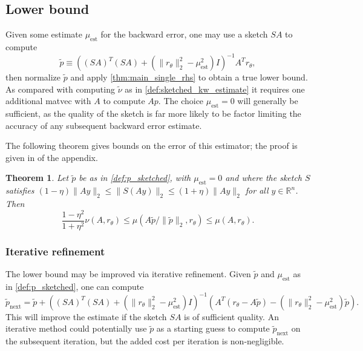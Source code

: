 \documentclass{article}
\newtheorem{theorem}{Theorem}
\newcommand{\ts}{^T}
\DeclareMathOperator{\est}{est}
\begin{document}
\subsection{Lower bound} \label{sec:lower_bound}

Given some estimate $\mu_{\text{est}}$ for the backward error, one may use a sketch $SA$ to compute
\begin{equation}\label{def:p_sketched}
    \widetilde{p} \equiv \left((SA)\ts (SA) + (\|r_\theta\|_2^2 - \mu_{\text{est}}^2)I\right)^{-1}A\ts r_\theta,
\end{equation}
then normalize $\widetilde{p}$ and apply \cref{thm:main_single_rhs} to obtain a true lower bound. As compared with computing $\widetilde{\nu}$ as in \cref{def:sketched_kw_estimate} it requires one additional matvec with $A$ to compute $Ap$. The choice $\mu_{\est}=0$ will generally be sufficient, as the quality of the sketch is far more likely to be factor limiting the accuracy of any subsequent backward error estimate.

The following theorem gives bounds on the error of this estimator; the proof is given in  of the appendix.
\begin{theorem}\label{thm:lower_bound_accuracy}
    Let $\widetilde{p}$ be as in \cref{def:p_sketched}, with $\mu_{\text{est}} =0$ and where the sketch $S$ satisfies $(1-\eta)\|Ay\|_2\leq \|S(Ay)\|_2\leq (1+\eta)\|Ay\|_2$ for all $y\in \mathbb{R}^n$. Then
    \begin{equation*}
        \frac{1-\eta^2}{1+\eta^2}\nu(A,r_\theta) \leq \mu(A\widetilde{p}/\|\widetilde{p}\|_2, r_\theta) \leq \mu(A, r_\theta).
    \end{equation*}
\end{theorem}

\subsubsection{Iterative refinement}
The lower bound may be improved via iterative refinement. Given $\widetilde{p}$ and $\mu_{\text{est}}$ as in \cref{def:p_sketched}, one can compute
\begin{equation}\label{eqn:iterative_refinement}
    \widetilde{p}_{\text{next}} = \widetilde{p} + \left((SA)\ts (SA) + (\|r_\theta\|_2^2 - \mu_{\text{est}}^2)I\right)^{-1}(A\ts (r_\theta -A\widetilde{p}) - (\|r_\theta\|_2^2 - \mu_{\text{est}}^2)\widetilde{p}).
\end{equation}
This will improve the estimate if the sketch $SA$ is of sufficient quality. An iterative method could potentially use $\widetilde{p}$ as a starting guess to compute $\widetilde{p}_{\text{next}}$ on the subsequent iteration, but the added cost per iteration is non-negligible.
\end{document}
